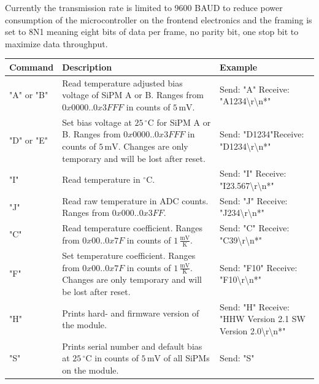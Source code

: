 Currently the transmission rate is limited to 9600 BAUD to reduce power consumption of the microcontroller on the frontend electronics and the framing is set to 8N1 meaning eight 
bits of data per frame, no parity bit, one stop bit to maximize data throughput.

	\begin{table}
		\begin{center}
			\begin{tabular}[]{|l||p{6cm}|p{4cm}|}
			\hline
			Command & Description & Example \\
			\hline
			"A" or "B" & Read temperature adjusted bias voltage of SiPM A or B. Ranges from $0x0000..0x3FFF$ in counts of $5\,\text{mV}$. & Send: "A"
			\newline Receive: "A1234\textbackslash r\textbackslash n*"\\
			\hline
			"D" or "E" & Set bias voltage at $25\,^{\circ} \text{C}$ for SiPM A or B. Ranges from $0x0000..0x3FFF$ in counts of $5\,\text{mV}$. Changes are only 
			temporary and will be lost after reset.& Send: "D1234"\newline Receive: "D1234\textbackslash r\textbackslash n*"\\
			\hline
			"I" & Read temperature in $^{\circ}\text{C}$. & Send: "I" \newline Receive: "I23.567\textbackslash r\textbackslash n*" \\
			\hline
			"J" & Read raw temperature in ADC counts. Ranges from $0x000..0x3FF$. & Send: "J" \newline Receive: "J234\textbackslash r\textbackslash n*" \\
			\hline
			"C" & Read temperature coefficient. Ranges from $0x00..0x7F$ in counts of $1\,\frac{\text{mV}}{\text{K}}$. & Send: "C" 
			\newline Receive: "C39\textbackslash r\textbackslash n*" \\
			\hline
			"F" & Set temperature coefficient. Ranges from $0x00..0x7F$ in counts of $1\,\frac{\text{mV}}{\text{K}}$. Changes are only temporary and 
			will be lost after reset. & Send: "F10" \newline Receive: "F10\textbackslash r\textbackslash n*" \\
			\hline
			"H" & Prints hard- and firmware version of the module. & Send: "H" \newline Receive: "HHW Version 2.1 SW Version 2.0\textbackslash r\textbackslash n*" \\
			\hline
			"S" & Prints serial number and default bias at $25\,^{\circ} \text{C}$ in counts of $5\, \text{mV}$ of all SiPMs on the module. &  Send: "S" 

\end{tabular}
\end{center}
\end{table}
